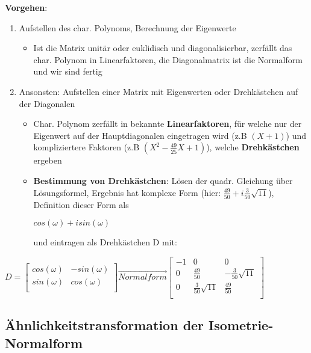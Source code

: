 \documentclass[10pt,a4paper]{article}
\begin{document}
	\textbf{Vorgehen}:
	\begin{enumerate}
		\item Aufstellen des char. Polynoms, Berechnung der Eigenwerte
		\begin{itemize}
			\item Ist die Matrix unitär oder euklidisch und diagonalisierbar, zerfällt das char. Polynom in Linearfaktoren, die Diagonalmatrix ist die Normalform und wir sind fertig
		\end{itemize}
		\item Ansonsten: Aufstellen einer Matrix mit Eigenwerten oder Drehkästchen auf der Diagonalen
		\begin{itemize}
			\item Char. Polynom zerfällt in bekannte \textbf{Linearfaktoren}, für welche nur der Eigenwert auf der Hauptdiagonalen eingetragen wird (z.B $(X + 1)$) und kompliziertere Faktoren (z.B $(X^2 - \frac{49}{25}X + 1)$), welche \textbf{Drehkästchen} ergeben
			\item \textbf{Bestimmung von Drehkästchen}: Lösen der quadr. Gleichung über Lösungsformel, Ergebnis hat komplexe Form (hier: $\frac{49}{50} + i\frac{3}{50}\sqrt{11}$), Definition dieser Form als
			\begin{center}
				$cos(\omega) + isin(\omega)$
			\end{center}
			und eintragen als Drehkästchen D mit:
		\end{itemize}
	\end{enumerate}
		\begin{center}
		$D = \begin{bmatrix}
			cos(\omega) & -sin(\omega)\\
			sin(\omega) & cos(\omega)\\
		\end{bmatrix}
	\overrightarrow{Normalform}
		\begin{bmatrix}
			-1 & 0 & 0 \\
			0 & \frac{49}{50} & -\frac{3}{50}\sqrt{11}\\
			0 & \frac{3}{50}\sqrt{11} & \frac{49}{50}\\
		\end{bmatrix}$
	\end{center}
	
	\subsection{Ähnlichkeitstransformation der Isometrie-Normalform}
	\label{os:sub:aehnlichkeitstransformation_der_isometrie_normalform}
	
\end{document}
